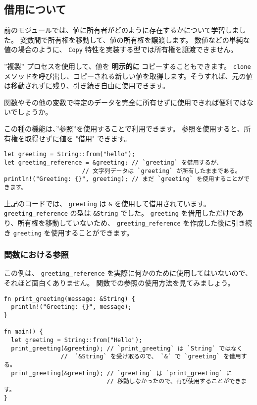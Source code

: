 \subsection{借用について}

前のモジュールでは、値に所有者がどのように存在するかについて学習しました。 変数間で所有権を移動して、値の所有権を譲渡します。 数値などの単純な値の場合のように、 \texttt{Copy} 特性を実装する型では所有権を譲渡できません。

''複製'' プロセスを使用して、値を \textbf{明示的に} コピーすることもできます。 \texttt{clone} メソッドを呼び出し、コピーされる新しい値を取得します。そうすれば、元の値は移動されずに残り、引き続き自由に使用できます。

関数やその他の変数で特定のデータを完全に所有せずに使用できれば便利ではないでしょうか。

この種の機能は、''参照''を使用することで利用できます。 参照を使用すると、所有権を取得せずに値を "借用" できます。


\begin{lstlisting}[numbers=none]
let greeting = String::from("hello");
let greeting_reference = &greeting; // `greeting` を借用するが、
                      // 文字列データは `greeting` が所有したままである。
println!("Greeting: {}", greeting); // まだ `greeting` を使用することができます。
\end{lstlisting}

上記のコードでは、 \texttt{greeting} は \texttt{\&} を使用して借用されています。 \texttt{greeting\_reference} の型は \texttt{\&String} でした。 \texttt{greeting} を借用しただけであり、所有権を移動していないため、 \texttt{greeting\_reference} を作成した後に引き続き \texttt{greeting} を使用することができます。

\subsubsection{関数における参照}

この例は、 \texttt{greeting\_reference} を実際に何かのために使用してはいないので、それほど面白くありません。 関数での参照の使用方法を見てみましょう。

\begin{lstlisting}[numbers=none]
fn print_greeting(message: &String) {
  println!("Greeting: {}", message);
}

fn main() {
  let greeting = String::from("Hello");
  print_greeting(&greeting); // `print_greeting` は `String` ではなく
                //  `&String` を受け取るので、 `&` で `greeting` を借用する。
  print_greeting(&greeting); // `greeting` は `print_greeting` に
                             // 移動しなかったので、再び使用することができます。
}
\end{lstlisting}

